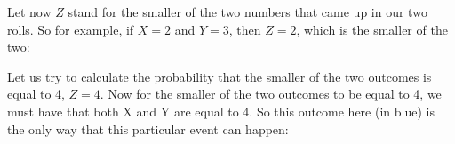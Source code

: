 \documentclass[pdftex, brazil, 12pt, twoside]{article}
\begin{document}
\begin{figure}[H]
  \begin{center}
  \end{center}
\end{figure}

Let now $Z$ stand for the smaller of the two numbers
that came up in our two rolls.
So for example, if $X = 2$ and $Y = 3$, then $Z = 2$,
which is the smaller of the two:

\begin{figure}[H]
  \begin{center}
  \end{center}
\end{figure}

Let us try to calculate the probability that the smaller
of the two outcomes is equal to 4, $Z = 4$.
Now for the smaller of the two outcomes to be equal to 4, we
must have that both X and Y are equal to 4.
So this outcome here (in blue) is the only way that this particular
event can happen:

\begin{figure}[H]
  \begin{center}
  \end{center}
\end{figure}
\end{document}

